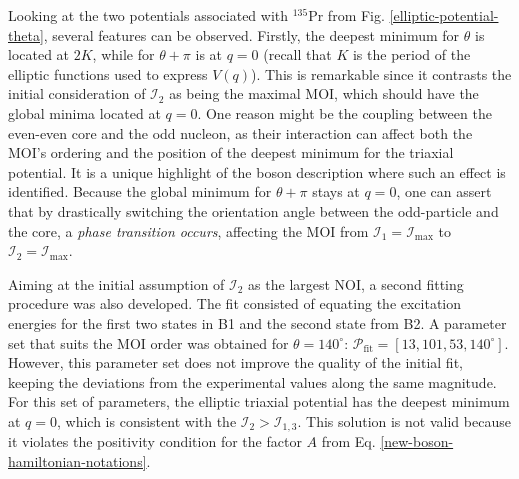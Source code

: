 Looking at the two potentials associated with $^{135}$Pr from Fig. \ref{elliptic-potential-theta}, several features can be observed. Firstly, the deepest minimum for $\theta$ is located at $2K$, while for $\theta+\pi$ is at $q=0$ (recall that $K$ is the period of the elliptic functions used to express $V(q)$). This is remarkable since it contrasts the initial consideration of $\mathcal{I}_2$ as being the maximal MOI, which should have the global minima located at $q=0$. One reason might be the coupling between the even-even core and the odd nucleon, as their interaction can affect both the MOI's ordering and the position of the deepest minimum for the triaxial potential. It is a unique highlight of the boson description where such an effect is identified. Because the global minimum for $\theta+\pi$ stays at $q=0$, one can assert that by drastically switching the orientation angle between the odd-particle and the core, a \emph{phase transition occurs}, affecting the MOI from $\mathcal{I}_1=\mathcal{I}_\text{max}$ to $\mathcal{I}_2=\mathcal{I}_\text{max}$.

Aiming at the initial assumption of $\mathcal{I}_2$ as the largest NOI, a second fitting procedure was also developed. The fit consisted of equating the excitation energies for the first two states in B1 and the second state from B2. A parameter set that suits the MOI order was obtained for $\theta=140^\circ$: $\mathcal{P}_\text{fit}=\left[13,101,53,140^\circ\right]$. However, this parameter set does not improve the quality of the initial fit, keeping the deviations from the experimental values along the same magnitude. For this set of parameters, the elliptic triaxial potential has the deepest minimum at $q=0$, which is consistent with the $\mathcal{I}_2>\mathcal{I}_{1,3}$. This solution is not valid because it violates the positivity condition for the factor $A$ from Eq. \ref{new-boson-hamiltonian-notations}.

